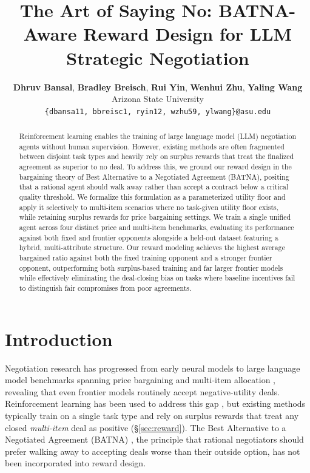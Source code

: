 \documentclass[11pt]{article}
\title{The Art of Saying No: BATNA-Aware Reward Design for LLM Strategic Negotiation}
\author{
  \textbf{Dhruv Bansal},
  \textbf{Bradley Breisch},
  \textbf{Rui Yin},
  \textbf{Wenhui Zhu},
  \textbf{Yaling Wang}
\\
  Arizona State University \\
  \small{
    \texttt{\{dbansa11, bbreisc1, ryin12, wzhu59, ylwang\}@asu.edu}
  }
}
\begin{document}
\maketitle
\raggedbottom

\begin{abstract}
Reinforcement learning enables the training of large language model (LLM) negotiation agents without human supervision. However, existing methods are often fragmented between disjoint task types and heavily rely on surplus rewards that treat the finalized agreement as superior to no deal. To address this, we ground our reward design in the bargaining theory of Best Alternative to a Negotiated Agreement (BATNA), positing that a rational agent should walk away rather than accept a contract below a critical quality threshold. We formalize this formulation as a parameterized utility floor and apply it selectively to multi-item scenarios where no task-given utility floor exists, while retaining surplus rewards for price bargaining settings. We train a single unified agent across four distinct price and multi-item benchmarks, evaluating its performance against both fixed and frontier opponents alongside a held-out dataset featuring a hybrid, multi-attribute structure. Our reward modeling achieves the highest average bargained ratio against both the fixed training opponent and a stronger frontier opponent, outperforming both surplus-based training and far larger frontier models while effectively eliminating the deal-closing bias on tasks where baseline incentives fail to distinguish fair compromises from poor agreements.
\end{abstract}

\section{Introduction}

Negotiation research has progressed from early neural models \citep{lewis2017deal, he2018decoupling} to large language model \citep[LLM;][]{minaee2024llmsurvey} benchmarks spanning price bargaining and multi-item allocation \citep{xia2024measuring, kwon2024llmseffectivenegotiators, bianchi2024negotiationarena, noh2024personalities, chatterjee2024agreemate, hua2024gametheoretic}, revealing that even frontier models routinely accept negative-utility deals. Reinforcement learning has been used to address this gap \citep{liu2026instructing, bergemann2026bilateral, vendrell2026gametalk, zeng2025repo, long2025evoemo, oh2026merit}, but existing methods typically train on a single task type and rely on surplus rewards that treat any closed \emph{multi-item} deal as positive (\S\ref{sec:reward}). The Best Alternative to a Negotiated Agreement (BATNA) \citep{fisher1981gettingtoyes}, the principle that rational negotiators should prefer walking away to accepting deals worse than their outside option, has not been incorporated into reward design.
\end{document}
